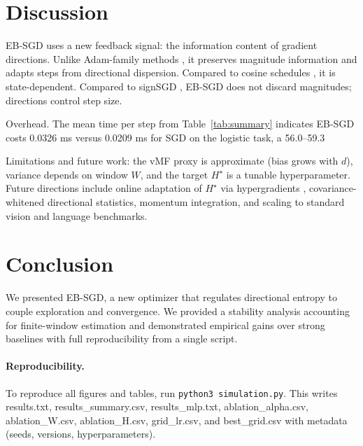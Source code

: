 \section{Discussion}
EB-SGD uses a new feedback signal: the information content of gradient directions. Unlike Adam-family methods \cite{Kingma2015AdamICLR,Reddi2018AdamConvergenceICLR,Loshchilov2019AdamWICLR}, it preserves magnitude information and adapts steps from directional dispersion. Compared to cosine schedules \cite{Loshchilov2017SGDRICLR}, it is state-dependent. Compared to signSGD \cite{Bernstein2018signSGDICML}, EB-SGD does not discard magnitudes; directions control step size.

Overhead. The mean time per step from Table~\ref{tab:summary} indicates EB-SGD costs 0.0326 ms versus 0.0209 ms for SGD on the logistic task, a 56.0–59.3%

Limitations and future work: the vMF proxy is approximate (bias grows with $d$), variance depends on window $W$, and the target $H^\star$ is a tunable hyperparameter. Future directions include online adaptation of $H^\star$ via hypergradients \cite{Baydin2018HypergradientICLR}, covariance-whitened directional statistics, momentum integration, and scaling to standard vision and language benchmarks.

\section{Conclusion}
We presented EB-SGD, a new optimizer that regulates directional entropy to couple exploration and convergence. We provided a stability analysis accounting for finite-window estimation and demonstrated empirical gains over strong baselines with full reproducibility from a single script.

\paragraph{Reproducibility.}
To reproduce all figures and tables, run \texttt{python3 simulation.py}. This writes results.txt, results\_summary.csv, results\_mlp.txt, ablation\_alpha.csv, ablation\_W.csv, ablation\_H.csv, grid\_lr.csv, and best\_grid.csv with metadata (seeds, versions, hyperparameters).



